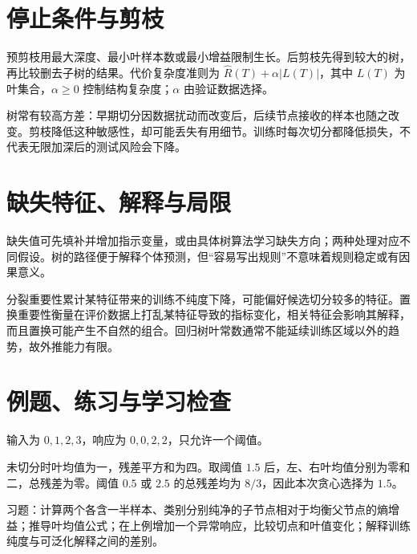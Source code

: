 \section{停止条件与剪枝}

预剪枝用最大深度、最小叶样本数或最小增益限制生长。后剪枝先得到较大的树，再比较删去子树的结果。代价复杂度准则为 $\widehat R(T)+\alpha|L(T)|$，其中 $L(T)$ 为叶集合，$\alpha\geq0$ 控制结构复杂度；$\alpha$ 由验证数据选择。

树常有较高方差：早期切分因数据扰动而改变后，后续节点接收的样本也随之改变。剪枝降低这种敏感性，却可能丢失有用细节。训练时每次切分都降低损失，不代表无限加深后的测试风险会下降。

\section{缺失特征、解释与局限}

缺失值可先填补并增加指示变量，或由具体树算法学习缺失方向；两种处理对应不同假设。树的路径便于解释个体预测，但“容易写出规则”不意味着规则稳定或有因果意义。

分裂重要性累计某特征带来的训练不纯度下降，可能偏好候选切分较多的特征。置换重要性衡量在评价数据上打乱某特征导致的指标变化，相关特征会影响其解释，而且置换可能产生不自然的组合。回归树叶常数通常不能延续训练区域以外的趋势，故外推能力有限。

\section{例题、练习与学习检查}

\begin{example}[一个回归树切分]
输入为 $0,1,2,3$，响应为 $0,0,2,2$，只允许一个阈值。
\end{example}
\begin{solve}
未切分时叶均值为一，残差平方和为四。取阈值 $1.5$ 后，左、右叶均值分别为零和二，总残差为零。阈值 $0.5$ 或 $2.5$ 的总残差均为 $8/3$，因此本次贪心选择为 $1.5$。
\end{solve}

习题：计算两个各含一半样本、类别分别纯净的子节点相对于均衡父节点的熵增益；推导叶均值公式；在上例增加一个异常响应，比较切点和叶值变化；解释训练纯度与可泛化解释之间的差别。





